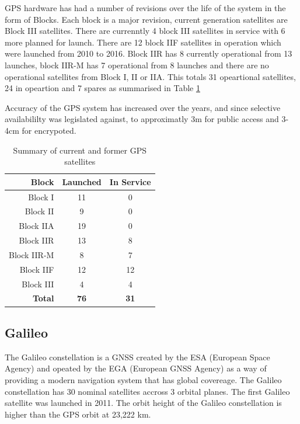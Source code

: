 GPS hardware has had a number of revisions over the life of the system in the form of Blocks. Each block is a major revision, current generation satellites are Block III
satellites. There are currenntly 4 block III satellites in service with 6 more planned for launch. There are 12 block IIF satellites in operation which were launched from
2010 to 2016. Block IIR has 8 currently operational from 13 launches, block IIR-M has 7 operational from 8 launches and there are no operational satellites from Block I,
II or IIA. This totals 31 opeartional satellites, 24 in opeartion and 7 spares as summarised in Table \ref{tab:GPSSatSum}

Accuracy of the GPS system has increased over the years, and since selective availabililty was legislated against, to approximatly 3m for public access and 3-4cm for encrypoted.

\renewcommand{\arraystretch}{1.5}
\begin{table}
    \begin{center}
        \caption{Summary of current and former GPS satellites}
        \label{tab:GPSSatSum}
        \begin{tabular}{ |r|c|c| }
            \hline
            \textbf{Block} & \textbf{Launched} & \textbf{In Service} \\
            \hline
            Block I & 11 & 0\\
            \hline
            Block II & 9 & 0\\
            \hline
            Block IIA & 19 & 0\\
            \hline
            Block IIR & 13 & 8\\
            \hline
            Block IIR-M & 8 & 7\\
            \hline
            Block IIF & 12 & 12\\
            \hline
            Block III & 4 & 4\\
            \hline
            \hline
            \textbf{Total} & \textbf{76} & \textbf{31}\\
            \hline
        \end{tabular}
    \end{center}
\end{table}
\renewcommand{\arraystretch}{1}

\subsection{Galileo} \label{subsec:GNSS_GalileoIntro}
The Galileo constellation is a GNSS created by the ESA (European Space Agency) and opeated by the EGA (European GNSS Agency) as a way of providing a modern navigation
system that has global covereage. The Galileo constellation has 30 nominal satellites accross 3 orbital planes. The first Galileo satellite was launched in 2011.
The orbit height of the Galileo constellation is higher than the GPS orbit at 23,222 km. 

